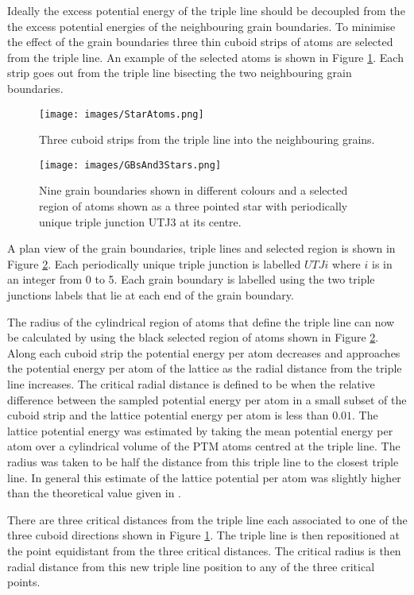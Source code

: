 \documentclass[12pt,a4paper,openany]{report}
\begin{document}
Ideally the excess potential energy of the triple line should be decoupled from the the excess potential energies of the neighbouring grain boundaries. To minimise the effect of the grain boundaries three thin cuboid strips of atoms are selected from the triple line. An example of the selected atoms is shown in Figure \ref{fig:StarAtoms}. Each strip goes out from the triple line bisecting the two neighbouring grain boundaries. 

\begin{figure}[H]
	\centering
	\texttt{[image: images/StarAtoms.png]} 
	\caption{Three cuboid strips from the triple line into the
	neighbouring grains.}
	\label{fig:StarAtoms}
\end{figure}

\begin{figure}[H]
	\centering
	\texttt{[image: images/GBsAnd3Stars.png]} 
	\caption{Nine grain boundaries shown in different colours and a selected region of atoms shown as a three pointed star with periodically unique triple junction UTJ3 at its centre.}   
	\label{fig:GBsandStar}
\end{figure}


A plan view of the grain boundaries, triple lines and selected region is shown in Figure \ref{fig:GBsandStar}. Each periodically unique triple junction is labelled $UTJi$ where $i$ is in an integer from 0 to 5. Each grain boundary is labelled using the two triple junctions labels that lie at each end of the grain boundary.

The radius of the cylindrical region of atoms that define the triple line can now be calculated by using the black selected region of atoms shown in Figure \ref{fig:GBsandStar}. Along each cuboid strip the potential energy per atom decreases and approaches the potential energy per atom of the lattice as the radial distance from the triple line increases. The critical radial distance is defined to be when the relative difference  between the sampled potential energy per atom in a small subset of the cuboid strip and the lattice potential energy per atom is less than $0.01$. The lattice potential energy was estimated by taking the mean potential energy per atom over a cylindrical volume of the PTM atoms centred at the triple line. The radius was taken to be half the distance from this triple line to the closest triple line. In general this estimate of the lattice potential per atom was slightly higher than the theoretical value given in \cite{Zope2003}.

There are three critical distances from the triple line each associated to one of the three cuboid directions shown in Figure \ref{fig:StarAtoms}. The triple line is then repositioned at the point equidistant from the three critical distances. The critical radius is then radial distance from this new triple line position to any of the three critical points.       
\end{document}
